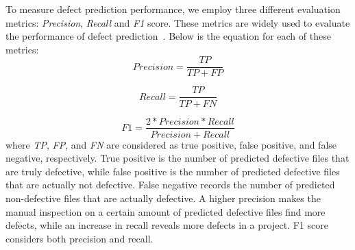 To measure defect prediction performance, we employ three different evaluation metrics: \textit{Precision}, \textit{Recall} and \textit{F1} score. These metrics are widely used to evaluate the performance of defect prediction~\cite{menzies2007data, menzies2010defect, nam2013transfer}. %
Below is the equation for each of these metrics:
\begin{equation}
\label{eq:precision}
Precision = \frac{TP}{TP+FP}
\end{equation}

\begin{equation}
\label{eq:recall}
Recall = \frac{TP}{TP+FN}
\end{equation}

\begin{equation}
\label{eq:f1}
F1 = \frac{2 * Precision * Recall}{Precision + Recall}
\end{equation}
where \textit{TP}, \textit{FP}, and \textit{FN} are considered as true positive, false positive, and false negative, respectively. True positive is the number of predicted defective files that are truly defective, while false positive is the number of predicted defective files that are actually not defective. False negative records the number of predicted non-defective files that are actually defective. A higher precision makes the manual inspection on a certain amount of predicted defective files find more defects, while an increase in recall reveals more defects in a project. F1 score considers both precision and recall.
